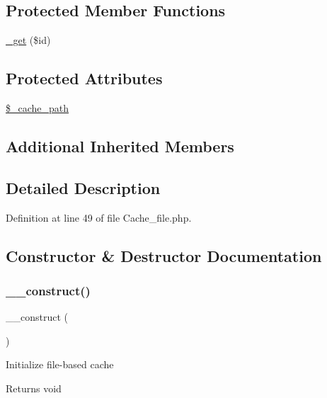 \subsection*{Protected Member Functions}
\begin{DoxyCompactItemize}
\item 
\mbox{\hyperlink{class_c_i___cache__file_aae09ed79c1d2dc8b2093602181ddf911}{\+\_\+get}} (\$id)
\end{DoxyCompactItemize}
\subsection*{Protected Attributes}
\begin{DoxyCompactItemize}
\item 
\mbox{\hyperlink{class_c_i___cache__file_ae9407d6ae1ddd132cca3c7f855f89dfe}{\$\+\_\+cache\+\_\+path}}
\end{DoxyCompactItemize}
\subsection*{Additional Inherited Members}


\subsection{Detailed Description}


Definition at line 49 of file Cache\+\_\+file.\+php.



\subsection{Constructor \& Destructor Documentation}
\mbox{\label{class_c_i___cache__file_a095c5d389db211932136b53f25f39685}} 
\subsubsection{\texorpdfstring{\_\_construct()}{\_\_construct()}}
{\footnotesize\ttfamily \+\_\+\+\_\+construct (\begin{DoxyParamCaption}{ }\end{DoxyParamCaption})}

Initialize file-\/based cache

\begin{DoxyReturn}{Returns}
void 
\end{DoxyReturn}


